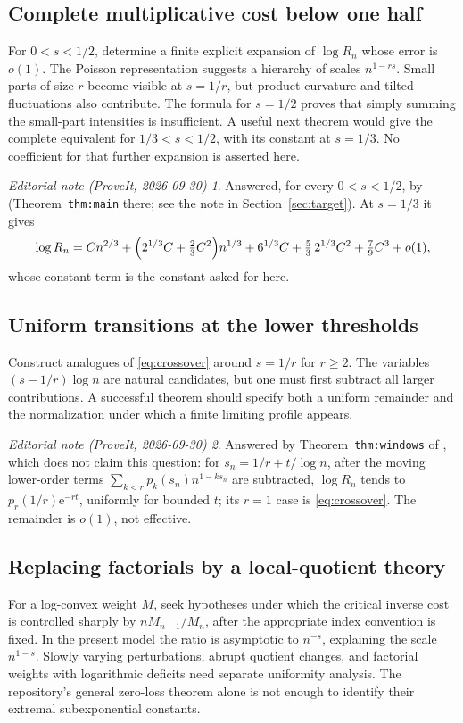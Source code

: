 \documentclass[11pt,a4paper]{article}
\theoremstyle{definition}
\theoremstyle{remark}
\newtheorem*{ednotelater}{Editorial note (ProveIt, 2026-09-30)}
\newcommand{\ee}{\mathrm e}
\numberwithin{equation}{section}
\begin{document}
\subsection{Complete multiplicative cost below one half}
For $0<s<1/2$, determine a finite explicit expansion of $\log R_n$
whose error is $o(1)$. The Poisson representation suggests a hierarchy
of scales $n^{1-rs}$. Small parts of size $r$ become visible at
$s=1/r$, but product curvature and tilted fluctuations also contribute.
The formula for $s=1/2$ proves that simply summing the small-part
intensities is insufficient. A useful next theorem would give the
complete equivalent for $1/3<s<1/2$, with its constant at $s=1/3$.
No coefficient for that further expansion is asserted here.
\begin{ednotelater}
Answered, for every $0<s<1/2$, by
 (Theorem~\texttt{thm:main}
there; see the note in Section~\ref{sec:target}). At $s=1/3$ it gives
\[
 \log R_n=Cn^{2/3}+\Bigl(2^{1/3}C+\tfrac23C^2\Bigr)n^{1/3}
 +6^{1/3}C+\tfrac53\,2^{1/3}C^2+\tfrac79C^3+o(1),
\]
whose constant term is the constant asked for here.
\end{ednotelater}

\subsection{Uniform transitions at the lower thresholds}
Construct analogues of \eqref{eq:crossover} around $s=1/r$ for
$r\ge2$. The variables $(s-1/r)\log n$ are natural candidates, but
one must first subtract all larger contributions. A successful theorem
should specify both a uniform remainder and the normalization under
which a finite limiting profile appears.
\begin{ednotelater}
Answered by Theorem~\texttt{thm:windows} of
, which does not claim this
question: for $s_n=1/r+t/\log n$, after the moving lower-order terms
$\sum_{k<r}p_k(s_n)n^{1-ks_n}$ are subtracted, $\log R_n$ tends to
$p_r(1/r)\ee^{-rt}$, uniformly for bounded $t$; its $r=1$ case is
\eqref{eq:crossover}. The remainder is $o(1)$, not effective.
\end{ednotelater}

\subsection{Replacing factorials by a local-quotient theory}
For a log-convex weight $M$, seek hypotheses under which the critical
inverse cost is controlled sharply by $nM_{n-1}/M_n$, after the
appropriate index convention is fixed. In the present model the ratio
is asymptotic to $n^{-s}$, explaining the scale $n^{1-s}$.
Slowly varying perturbations, abrupt quotient changes, and factorial
weights with logarithmic deficits need separate uniformity analysis.
The repository's general zero-loss theorem alone is not enough to
identify their extremal subexponential constants.
\end{document}
